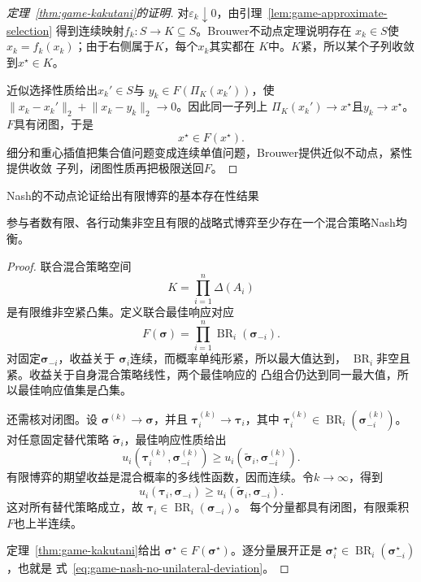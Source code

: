 \begin{proof}[定理~\ref{thm:game-kakutani}的证明]
对\(\varepsilon_k\downarrow0\)，由引理~\ref{lem:game-approximate-selection}
得到连续映射\(f_k:S\to K\subseteq S\)。Brouwer不动点定理说明存在
\(x_k\in S\)使\(x_k=f_k(x_k)\)；由于右侧属于\(K\)，每个\(x_k\)其实都在
\(K\)中。\(K\)紧，所以某个子列收敛到\(x^\star\in K\)。

近似选择性质给出\(x_k'\in S\)与
\(y_k\in F(\Pi_K(x_k'))\)，使
\(\lVert x_k-x_k'\rVert_2+\lVert x_k-y_k\rVert_2\to0\)。因此同一子列上
\(\Pi_K(x_k')\to x^\star\)且\(y_k\to x^\star\)。\(F\)具有闭图，于是
\[
  x^\star\in F(x^\star).
\]
细分和重心插值把集合值问题变成连续单值问题，Brouwer提供近似不动点，紧性提供收敛
子列，闭图性质再把极限送回\(F\)。
\end{proof}
Nash的不动点论证给出有限博弈的基本存在性结果
\begin{theorem}[有限博弈存在混合Nash均衡]
\label{thm:game-nash-existence}
参与者数有限、各行动集非空且有限的战略式博弈至少存在一个混合策略Nash均衡。
\end{theorem}

\begin{proof}
联合混合策略空间
\[
  K=\prod_{i=1}^{n}\Delta(A_i)
\]
是有限维非空紧凸集。定义联合最佳响应对应
\[
  F(\bm{\sigma})
  =
  \prod_{i=1}^{n}
  \operatorname{BR}_i(\bm{\sigma}_{-i}).
\]
对固定\(\bm{\sigma}_{-i}\)，收益关于
\(\bm{\sigma}_i\)连续，而概率单纯形紧，所以最大值达到，
\(\operatorname{BR}_i\)非空且紧。收益关于自身混合策略线性，两个最佳响应的
凸组合仍达到同一最大值，所以最佳响应值集是凸集。

还需核对闭图。设
\(\bm{\sigma}^{(k)}\to\bm{\sigma}\)，并且
\(\bm{\tau}_i^{(k)}\to\bm{\tau}_i\)，其中
\(\bm{\tau}_i^{(k)}
\in\operatorname{BR}_i(\bm{\sigma}_{-i}^{(k)})\)。对任意固定替代策略
\(\widetilde{\bm{\sigma}}_i\)，最佳响应性质给出
\[
  u_i(\bm{\tau}_i^{(k)},\bm{\sigma}_{-i}^{(k)})
  \geq
  u_i(\widetilde{\bm{\sigma}}_i,\bm{\sigma}_{-i}^{(k)}).
\]
有限博弈的期望收益是混合概率的多线性函数，因而连续。令\(k\to\infty\)，得到
\[
  u_i(\bm{\tau}_i,\bm{\sigma}_{-i})
  \geq
  u_i(\widetilde{\bm{\sigma}}_i,\bm{\sigma}_{-i}).
\]
这对所有替代策略成立，故
\(\bm{\tau}_i\in\operatorname{BR}_i(\bm{\sigma}_{-i})\)。
每个分量都具有闭图，有限乘积\(F\)也上半连续。

定理~\ref{thm:game-kakutani}给出
\(\bm{\sigma}^\star\in F(\bm{\sigma}^\star)\)。逐分量展开正是
\(\bm{\sigma}_i^\star
\in\operatorname{BR}_i(\bm{\sigma}_{-i}^\star)\)，也就是
式~\eqref{eq:game-nash-no-unilateral-deviation}。
\end{proof}

